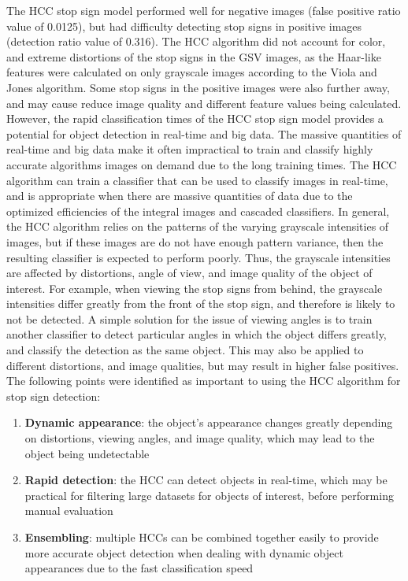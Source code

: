 The HCC stop sign model performed well for negative images (false positive ratio value of 0.0125), but had difficulty detecting stop signs in positive images (detection ratio value of 0.316). The HCC algorithm did not account for color, and extreme distortions of the stop signs in the GSV images, as the Haar-like features were calculated on only grayscale images according to the Viola and Jones algorithm. Some stop signs in the positive images were also further away, and may cause reduce image quality and different feature values being calculated. However, the rapid classification times of the HCC stop sign model provides a potential for object detection in real-time and big data. The massive quantities of real-time and big data make it often impractical to train and classify highly accurate algorithms images on demand due to the long training times. The HCC algorithm can train a classifier that can be used to classify images in real-time, and is appropriate when there are massive quantities of data due to the optimized efficiencies of the integral images and cascaded classifiers. In general, the HCC algorithm relies on the patterns of the varying grayscale intensities of images, but if these images are do not have enough pattern variance, then the resulting classifier is expected to perform poorly. Thus, the grayscale intensities are affected by distortions, angle of view, and image quality of the object of interest. For example, when viewing the stop signs from behind, the grayscale intensities differ greatly from the front of the stop sign, and therefore is likely to not be detected. A simple solution for the issue of viewing angles is to train another classifier to detect particular angles in which the object differs greatly, and classify the detection as the same object. This may also be applied to different distortions, and image qualities, but may result in higher false positives. The following points were identified as important to using the HCC algorithm for stop sign detection:

\begin{enumerate}
  \item \textbf{Dynamic appearance}: the object's appearance changes greatly depending on distortions, viewing angles, and image quality, which may lead to the object being undetectable
  \item \textbf{Rapid detection}: the HCC can detect objects in real-time, which may be practical for filtering large datasets for objects of interest, before performing manual evaluation
  \item \textbf{Ensembling}: multiple HCCs can be combined together easily to provide more accurate object detection when dealing with dynamic object appearances due to the fast classification speed
\end{enumerate}

